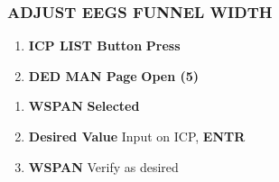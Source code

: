 \subsubsection{ADJUST EEGS FUNNEL WIDTH}
\label{subsec:m61:eegsfunneladjust}
\begin{checklistenumerate}
    \begin{enumerate}
        \item \textbf{ICP LIST Button} \dotfill \textbf{Press}
        \item \textbf{DED MAN Page} \dotfill \textbf{Open (5)} 
    \end{enumerate}
    \begin{enumerate}
        \item \textbf{WSPAN} \dotfill \textbf{Selected}
        \item \textbf{Desired Value} \dotfill Input on ICP, \textbf{ENTR}
        \item \textbf{WSPAN} \dotfill Verify as desired
    \end{enumerate}
\end{checklistenumerate}

\marginfigrestore